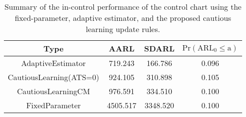 \begin{table}[!h]

\caption{Summary of the in-control performance of the control chart using the fixed-parameter, adaptive estimator, and the proposed cautious learning update rules.}
\centering
\begin{tabular}[t]{cccc}
\toprule
Type & AARL & SDARL & $\text{Pr}(\text{ARL}_0 \leq \text{a})$\\
\midrule
AdaptiveEstimator & 719.243 & 166.786 & 0.096\\
CautiousLearning(ATS=0) & 924.105 & 310.898 & 0.105\\
CautiousLearningCM & 976.591 & 334.510 & 0.100\\
FixedParameter & 4505.517 & 3348.520 & 0.100\\
\bottomrule
\end{tabular}
\end{table}

